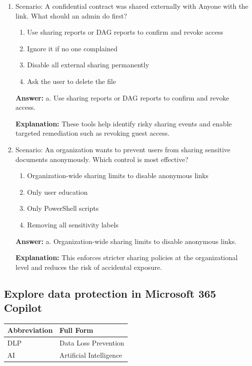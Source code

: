 \documentclass[10pt]{article}
\begin{document}
\begin{enumerate}[leftmargin=*]
\item Scenario: A confidential contract was shared externally with Anyone with the link. What should an admin do first?
\begin{enumerate}[label=\alph*., leftmargin=1.5em]
\item Use sharing reports or DAG reports to confirm and revoke access
\item Ignore it if no one complained
\item Disable all external sharing permanently
\item Ask the user to delete the file
\end{enumerate}
\textbf{Answer:} a. Use sharing reports or DAG reports to confirm and revoke access.

\textbf{Explanation:} These tools help identify risky sharing events and enable targeted remediation such as revoking guest access.

\item Scenario: An organization wants to prevent users from sharing sensitive documents anonymously. Which control is most effective?
\begin{enumerate}[label=\alph*., leftmargin=1.5em]
\item Organization-wide sharing limits to disable anonymous links
\item Only user education
\item Only PowerShell scripts
\item Removing all sensitivity labels
\end{enumerate}
\textbf{Answer:} a. Organization-wide sharing limits to disable anonymous links.

\textbf{Explanation:} This enforces stricter sharing policies at the organizational level and reduces the risk of accidental exposure.

\end{enumerate}
\clearpage

\subsection{Explore data protection in Microsoft 365 Copilot}

\begin{center}
\begin{tabular}{>{\raggedright\arraybackslash}p{} >{\raggedright\arraybackslash}p{}}
\toprule
\textbf{Abbreviation} & \textbf{Full Form} \\
\midrule
DLP & Data Loss Prevention \\
AI & Artificial Intelligence \\
\end{tabular}
\end{center}
\end{document}
